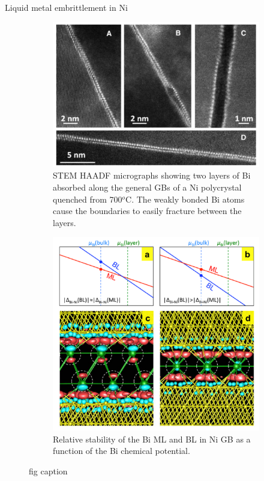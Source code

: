 \documentclass[aspectratio=169]{beamer}
\begin{document}
\begin{frame}{Liquid metal embrittlement in Ni}
\begin{figure}
    \centering
    \begin{subfigure}{0.45\textwidth}
        \centering
        \includegraphics[width=\linewidth]{lectures/figures/11_Bi_in_Ni.png}
    \caption{STEM HAADF micrographs showing two layers of Bi absorbed along the general GBs of a Ni polycrystal quenched from 700$^o$C. The weakly bonded Bi atoms cause the boundaries to easily fracture between the layers.\cite{luoRoleBilayerInterfacial2011}}
    \end{subfigure}
    \begin{subfigure}{0.45\textwidth}
        \centering
        \includegraphics[width=0.8\linewidth]{lectures/figures/11_Bi_in_Ni_DFT.png}
    \caption{Relative stability of the Bi ML and BL in Ni GB as a function of the Bi chemical potential.\cite{kangOriginBismuthInducedDecohesion2013}}
    \end{subfigure}
    \caption{fig caption}
    \label{fig}
\end{figure} 
\end{frame} 
\end{document}

